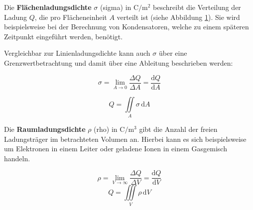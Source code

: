 \begin{frame}
{	Die \textbf{Flächenladungsdichte} $\sigma$ (sigma) in $\mathrm{C/m^2}$ beschreibt die Verteilung der Ladung $Q$,
	 die pro Flächeneinheit $A$ verteilt ist (siehe Abbildung \ref{fig:flächenladung}). 
	Sie wird beispielsweise bei der Berechnung von Kondensatoren, welche zu einem späteren Zeitpunkt eingeführt werden, benötigt.

	\begin{figure}[h!]
		\centering
	
		\s{}
		\label{fig:flächenladung}
	\end{figure}


	

	Vergleichbar zur Linienladungsdichte kann auch $\sigma$ über eine Grenzwertbetrachtung und damit über eine Ableitung beschrieben werden: 


	\begin{equation*}
		\sigma = \lim \limits_{A \to 0} \frac{\Delta Q}{\Delta A} = \frac{\mathrm{d}Q}{\mathrm{d}A}
	\end{equation*}

	\begin{equation*}
		Q = \iint\limits_A \sigma \, \mathrm{d}A
	\end{equation*}

	Die \textbf{Raumladungsdichte} $\rho$ (rho) in $\mathrm{C/m^3}$ gibt die Anzahl der freien Ladungsträger im betrachteten Volumen an. 
	Hierbei kann es sich beispielsweise um Elektronen in einem Leiter oder geladene Ionen in einem Gasgemisch handeln.
	

	\begin{figure}[h!]
		\centering
	
		\s{}
		\label{fig:raumladung}
	\end{figure}
	
	

	\begin{equation*}
		\rho = \lim \limits_{V \to \infty} \frac{\Delta Q}{\Delta V} = \frac{\mathrm{d}Q}{\mathrm{d}V}
	\end{equation*}
	\begin{equation*}
		Q = \iiint\limits_V \rho \, \mathrm{d}V
	\end{equation*}	

}
\end{frame}
